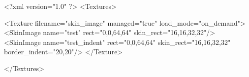 <?xml version="1.0" ?>
<Textures>

	<Texture filename="skin_image" managed="true" load_mode="on_demand">
		<SkinImage name="test" rect="0,0,64,64" skin_rect="16,16,32,32"/>
		<SkinImage name="test_indent" rect="0,0,64,64" skin_rect="16,16,32,32" border_indent="20,20"/>
	</Texture>
	
</Textures>
